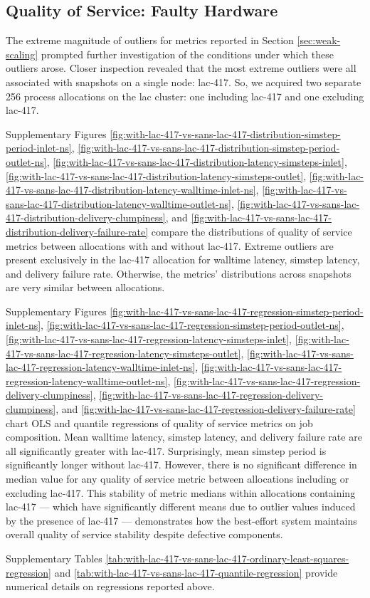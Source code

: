 \subsection{Quality of Service: Faulty Hardware}
\label{sec:with-lac-417-vs-sans-lac-417}

The extreme magnitude of outliers for metrics reported in Section \ref{sec:weak-scaling} prompted further investigation of the conditions under which these outliers arose.
Closer inspection revealed that the most extreme outliers were all associated with snapshots on a single node: lac-417.
So, we acquired two separate 256 process allocations on the lac cluster: one including lac-417 and one excluding lac-417.

Supplementary Figures \ref{fig:with-lac-417-vs-sans-lac-417-distribution-simstep-period-inlet-ns}, \ref{fig:with-lac-417-vs-sans-lac-417-distribution-simstep-period-outlet-ns}, \ref{fig:with-lac-417-vs-sans-lac-417-distribution-latency-simsteps-inlet}, \ref{fig:with-lac-417-vs-sans-lac-417-distribution-latency-simsteps-outlet}, \ref{fig:with-lac-417-vs-sans-lac-417-distribution-latency-walltime-inlet-ns}, \ref{fig:with-lac-417-vs-sans-lac-417-distribution-latency-walltime-outlet-ns}, \ref{fig:with-lac-417-vs-sans-lac-417-distribution-delivery-clumpiness}, and \ref{fig:with-lac-417-vs-sans-lac-417-distribution-delivery-failure-rate} compare the distributions of quality of service metrics between allocations with and without lac-417.
Extreme outliers are present exclusively in the lac-417 allocation for walltime latency, simstep latency, and delivery failure rate.
Otherwise, the metrics' distributions across snapshots are very similar between allocations.

Supplementary Figures \ref{fig:with-lac-417-vs-sans-lac-417-regression-simstep-period-inlet-ns}, \ref{fig:with-lac-417-vs-sans-lac-417-regression-simstep-period-outlet-ns}, \ref{fig:with-lac-417-vs-sans-lac-417-regression-latency-simsteps-inlet}, \ref{fig:with-lac-417-vs-sans-lac-417-regression-latency-simsteps-outlet}, \ref{fig:with-lac-417-vs-sans-lac-417-regression-latency-walltime-inlet-ns}, \ref{fig:with-lac-417-vs-sans-lac-417-regression-latency-walltime-outlet-ns}, \ref{fig:with-lac-417-vs-sans-lac-417-regression-delivery-clumpiness}, \ref{fig:with-lac-417-vs-sans-lac-417-regression-delivery-clumpiness}, and
\ref{fig:with-lac-417-vs-sans-lac-417-regression-delivery-failure-rate} chart OLS and quantile regressions of quality of service metrics on job composition.
Mean walltime latency, simstep latency, and delivery failure rate are all significantly greater with lac-417.
Surprisingly, mean simstep period is significantly longer without lac-417.
However, there is no significant difference in median value for any quality of service metric between allocations including or excluding lac-417.
This stability of metric medians within allocations containing lac-417 --- which have significantly different means due to outlier values induced by the presence of lac-417 --- demonstrates how the best-effort system maintains overall quality of service stability despite defective components.

Supplementary Tables \ref{tab:with-lac-417-vs-sans-lac-417-ordinary-least-squares-regression} and \ref{tab:with-lac-417-vs-sans-lac-417-quantile-regression} provide numerical details on regressions reported above.
